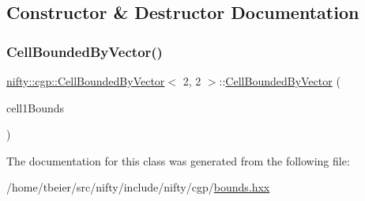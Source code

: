 \subsection{Constructor \& Destructor Documentation}
\mbox{\label{classnifty_1_1cgp_1_1CellBoundedByVector_3_012_00_012_01_4_af6f91256e589a2504b9362c4da176893}} 
\subsubsection{\texorpdfstring{Cell\+Bounded\+By\+Vector()}{CellBoundedByVector()}}
{\footnotesize\ttfamily \hyperlink{classnifty_1_1cgp_1_1CellBoundedByVector}{nifty\+::cgp\+::\+Cell\+Bounded\+By\+Vector}$<$ 2, 2 $>$\+::\hyperlink{classnifty_1_1cgp_1_1CellBoundedByVector}{Cell\+Bounded\+By\+Vector} (\begin{DoxyParamCaption}\item[{const \hyperlink{classnifty_1_1cgp_1_1CellBoundsVector}{Cell\+Bounds\+Vector}$<$ 2, 1 $>$ \&}]{cell1\+Bounds }\end{DoxyParamCaption})\hspace{0.3cm}{\ttfamily [inline]}}



The documentation for this class was generated from the following file\+:\begin{DoxyCompactItemize}
\item 
/home/tbeier/src/nifty/include/nifty/cgp/\hyperlink{bounds_8hxx}{bounds.\+hxx}\end{DoxyCompactItemize}
